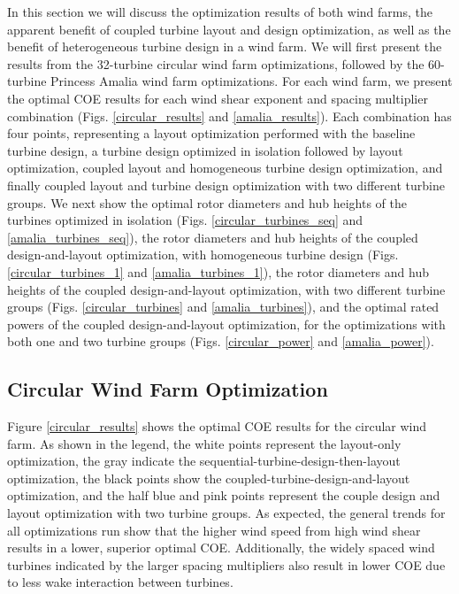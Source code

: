 \newcommand\myeq{\mkern1.5mu{=}\mkern1.5mu}


In this section we will discuss the optimization results of both wind farms, the apparent benefit of coupled turbine layout and design optimization, as well as the benefit of heterogeneous turbine design in a wind farm.
We will first present the results from the 32-turbine circular wind farm optimizations, followed by the 60-turbine Princess Amalia wind farm optimizations. For each wind farm, we present the optimal COE results for each wind shear exponent and spacing multiplier combination (Figs. \ref{circular_results} and \ref{amalia_results}). Each combination has four points, representing a layout optimization performed with the baseline turbine design, a turbine design optimized in isolation followed by layout optimization, coupled layout and homogeneous turbine design optimization, and finally coupled layout and turbine design optimization with two different turbine groups. 
We next show the optimal rotor diameters and hub heights of the turbines optimized in isolation (Figs. \ref{circular_turbines_seq} and \ref{amalia_turbines_seq}), the rotor diameters and hub heights of the coupled design-and-layout optimization, with homogeneous turbine design (Figs. \ref{circular_turbines_1} and \ref{amalia_turbines_1}), the rotor diameters and hub heights of the coupled design-and-layout optimization, with two different turbine groups (Figs. \ref{circular_turbines} and \ref{amalia_turbines}), and the optimal rated powers of the coupled design-and-layout optimization, for the optimizations with both one and two turbine groups (Figs. \ref{circular_power} and \ref{amalia_power}).



\subsection{Circular Wind Farm Optimization}

Figure \ref{circular_results} shows the optimal COE results for the circular wind farm. As shown in the legend, the white points represent the layout-only optimization, the gray indicate the sequential-turbine-design-then-layout optimization, the black points show the coupled-turbine-design-and-layout optimization, and the half blue and pink points represent the couple design and layout optimization with two turbine groups.  As expected, the general trends for all optimizations run show that the higher wind speed from high wind shear results in a lower, superior optimal COE. Additionally, the widely spaced wind turbines indicated by the larger spacing multipliers also result in lower COE due to less wake interaction between turbines. 

